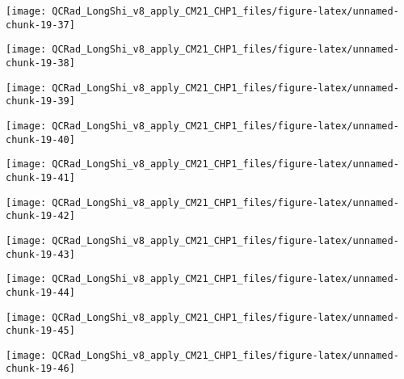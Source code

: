 \documentclass[
  10pt,
  a4paper,oneside]{article}
\begin{document}
\begin{center}\texttt{[image: QCRad\_LongShi\_v8\_apply\_CM21\_CHP1\_files/figure-latex/unnamed-chunk-19-37]} \end{center}

\begin{center}\texttt{[image: QCRad\_LongShi\_v8\_apply\_CM21\_CHP1\_files/figure-latex/unnamed-chunk-19-38]} \end{center}

\begin{center}\texttt{[image: QCRad\_LongShi\_v8\_apply\_CM21\_CHP1\_files/figure-latex/unnamed-chunk-19-39]} \end{center}

\begin{center}\texttt{[image: QCRad\_LongShi\_v8\_apply\_CM21\_CHP1\_files/figure-latex/unnamed-chunk-19-40]} \end{center}

\begin{center}\texttt{[image: QCRad\_LongShi\_v8\_apply\_CM21\_CHP1\_files/figure-latex/unnamed-chunk-19-41]} \end{center}

\begin{center}\texttt{[image: QCRad\_LongShi\_v8\_apply\_CM21\_CHP1\_files/figure-latex/unnamed-chunk-19-42]} \end{center}

\begin{center}\texttt{[image: QCRad\_LongShi\_v8\_apply\_CM21\_CHP1\_files/figure-latex/unnamed-chunk-19-43]} \end{center}

\begin{center}\texttt{[image: QCRad\_LongShi\_v8\_apply\_CM21\_CHP1\_files/figure-latex/unnamed-chunk-19-44]} \end{center}

\begin{center}\texttt{[image: QCRad\_LongShi\_v8\_apply\_CM21\_CHP1\_files/figure-latex/unnamed-chunk-19-45]} \end{center}

\begin{center}\texttt{[image: QCRad\_LongShi\_v8\_apply\_CM21\_CHP1\_files/figure-latex/unnamed-chunk-19-46]} \end{center}
\end{document}
